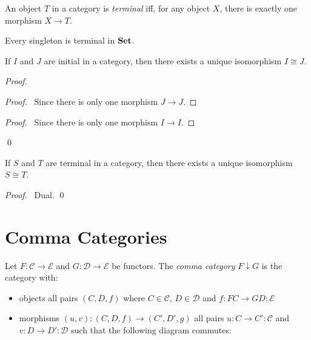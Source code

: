 \begin{df}
    An object $T$ in a category is \emph{terminal} iff, for any object $X$, there is exactly one morphism $X \rightarrow T$.
\end{df}

\begin{ex}
    Every singleton is terminal in $\mathbf{Set}$.
\end{ex}

\begin{prop}
    If $I$ and $J$ are initial in a category, then there exists a unique isomorphism $I \cong J$.
\end{prop}

\begin{proof}
    \pf
    \begin{proof}
        \pf\ Since there is only one morphism $J \rightarrow J$.
    \end{proof}
    \begin{proof}
        \pf\ Since there is only one morphism $I \rightarrow I$.
    \end{proof}
    \qed
\end{proof}

\begin{prop}
    If $S$ and $T$ are terminal in a category, then there exists a unique isomorphism $S \cong T$.
\end{prop}

\begin{proof}
    \pf\ Dual. \qed
\end{proof}

\section{Comma Categories}

\begin{df}
    Let $F : \mathcal{C} \rightarrow \mathcal{E}$ and $G : \mathcal{D} \rightarrow \mathcal{E}$ be functors. The \emph{comma category} $F \downarrow G$ is the category with:
    \begin{itemize}
        \item objects all pairs $(C,D,f)$ where $C \in \mathcal{C}$, $D \in \mathcal{D}$ and
              $f : FC \rightarrow GD : \mathcal{E}$
        \item morphisms $(u,v) : (C,D,f) \rightarrow (C',D',g)$ all pairs $u : C \rightarrow
                  C' : \mathcal{C}$ and $v : D \rightarrow D' : \mathcal{D}$ such that the
              following diagram commutes:

    \end{itemize}
\end{df}

